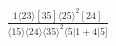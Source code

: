 \documentclass[varwidth, border=5pt]{standalone}
\begin{document}
\begin{my}
$\begin{gathered}
\scriptscriptstyle\frac{1⟨23⟩[35]⟨25⟩^2[24]}{⟨15⟩⟨24⟩⟨35⟩^2⟨5|1+4|5]}
\end{gathered}$
\end{my}
\end{document}

